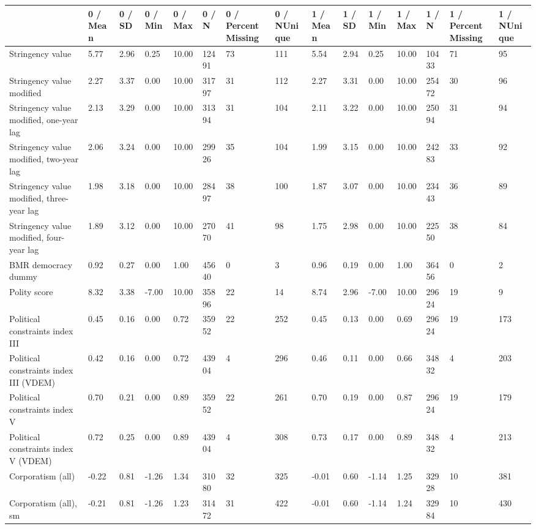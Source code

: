 
\begin{longtable}{lllllllllllllll}
\toprule
  & 0 / Mean & 0 / SD & 0 / Min & 0 / Max & 0 / N & 0 / PercentMissing & 0 / NUnique & 1 / Mean & 1 / SD & 1 / Min & 1 / Max & 1 / N & 1 / PercentMissing & 1 / NUnique\\
\midrule
Stringency value & 5.77 & 2.96 & 0.25 & 10.00 & 12491 & 73 & 111 & 5.54 & 2.94 & 0.25 & 10.00 & 10433 & 71 & 95\\
Stringency value modified & 2.27 & 3.37 & 0.00 & 10.00 & 31797 & 31 & 112 & 2.27 & 3.31 & 0.00 & 10.00 & 25472 & 30 & 96\\
Stringency value modified, one-year lag & 2.13 & 3.29 & 0.00 & 10.00 & 31394 & 31 & 104 & 2.11 & 3.22 & 0.00 & 10.00 & 25094 & 31 & 94\\
Stringency value modified, two-year lag & 2.06 & 3.24 & 0.00 & 10.00 & 29926 & 35 & 104 & 1.99 & 3.15 & 0.00 & 10.00 & 24283 & 33 & 92\\
Stringency value modified, three-year lag & 1.98 & 3.18 & 0.00 & 10.00 & 28497 & 38 & 100 & 1.87 & 3.07 & 0.00 & 10.00 & 23443 & 36 & 89\\
\addlinespace
Stringency value modified, four-year lag & 1.89 & 3.12 & 0.00 & 10.00 & 27070 & 41 & 98 & 1.75 & 2.98 & 0.00 & 10.00 & 22550 & 38 & 84\\
BMR democracy dummy & 0.92 & 0.27 & 0.00 & 1.00 & 45640 & 0 & 3 & 0.96 & 0.19 & 0.00 & 1.00 & 36456 & 0 & 2\\
Polity score & 8.32 & 3.38 & -7.00 & 10.00 & 35896 & 22 & 14 & 8.74 & 2.96 & -7.00 & 10.00 & 29624 & 19 & 9\\
Political constraints index III & 0.45 & 0.16 & 0.00 & 0.72 & 35952 & 22 & 252 & 0.45 & 0.13 & 0.00 & 0.69 & 29624 & 19 & 173\\
Political constraints index III (VDEM) & 0.42 & 0.16 & 0.00 & 0.72 & 43904 & 4 & 296 & 0.46 & 0.11 & 0.00 & 0.66 & 34832 & 4 & 203\\
\addlinespace
Political constraints index V & 0.70 & 0.21 & 0.00 & 0.89 & 35952 & 22 & 261 & 0.70 & 0.19 & 0.00 & 0.87 & 29624 & 19 & 179\\
Political constraints index V (VDEM) & 0.72 & 0.25 & 0.00 & 0.89 & 43904 & 4 & 308 & 0.73 & 0.17 & 0.00 & 0.89 & 34832 & 4 & 213\\
Corporatism (all) & -0.22 & 0.81 & -1.26 & 1.34 & 31080 & 32 & 325 & -0.01 & 0.60 & -1.14 & 1.25 & 32928 & 10 & 381\\
Corporatism (all), sm & -0.21 & 0.81 & -1.26 & 1.23 & 31472 & 31 & 422 & -0.01 & 0.60 & -1.14 & 1.24 & 32984 & 10 & 430\\

\end{longtable}
